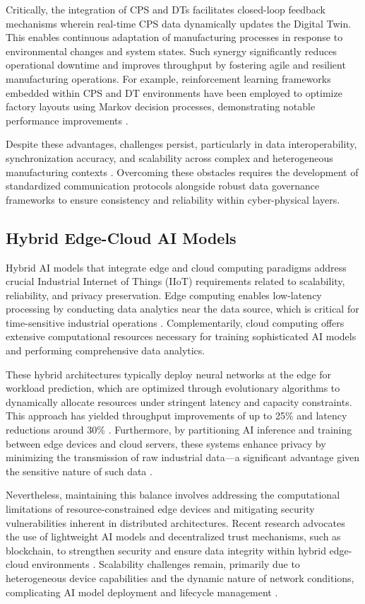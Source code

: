 \documentclass[11pt]{article}
\begin{document}
Critically, the integration of CPS and DTs facilitates closed-loop feedback mechanisms wherein real-time CPS data dynamically updates the Digital Twin. This enables continuous adaptation of manufacturing processes in response to environmental changes and system states. Such synergy significantly reduces operational downtime and improves throughput by fostering agile and resilient manufacturing operations. For example, reinforcement learning frameworks embedded within CPS and DT environments have been employed to optimize factory layouts using Markov decision processes, demonstrating notable performance improvements \cite{ref10}.

Despite these advantages, challenges persist, particularly in data interoperability, synchronization accuracy, and scalability across complex and heterogeneous manufacturing contexts \cite{ref13}. Overcoming these obstacles requires the development of standardized communication protocols alongside robust data governance frameworks to ensure consistency and reliability within cyber-physical layers.

\subsection{Hybrid Edge-Cloud AI Models}

Hybrid AI models that integrate edge and cloud computing paradigms address crucial Industrial Internet of Things (IIoT) requirements related to scalability, reliability, and privacy preservation. Edge computing enables low-latency processing by conducting data analytics near the data source, which is critical for time-sensitive industrial operations \cite{ref15}. Complementarily, cloud computing offers extensive computational resources necessary for training sophisticated AI models and performing comprehensive data analytics.

These hybrid architectures typically deploy neural networks at the edge for workload prediction, which are optimized through evolutionary algorithms to dynamically allocate resources under stringent latency and capacity constraints. This approach has yielded throughput improvements of up to 25\% and latency reductions around 30\% \cite{ref20}. Furthermore, by partitioning AI inference and training between edge devices and cloud servers, these systems enhance privacy by minimizing the transmission of raw industrial data—a significant advantage given the sensitive nature of such data \cite{ref22}.

Nevertheless, maintaining this balance involves addressing the computational limitations of resource-constrained edge devices and mitigating security vulnerabilities inherent in distributed architectures. Recent research advocates the use of lightweight AI models and decentralized trust mechanisms, such as blockchain, to strengthen security and ensure data integrity within hybrid edge-cloud environments \cite{ref31}. Scalability challenges remain, primarily due to heterogeneous device capabilities and the dynamic nature of network conditions, complicating AI model deployment and lifecycle management \cite{ref33}.
\end{document}

